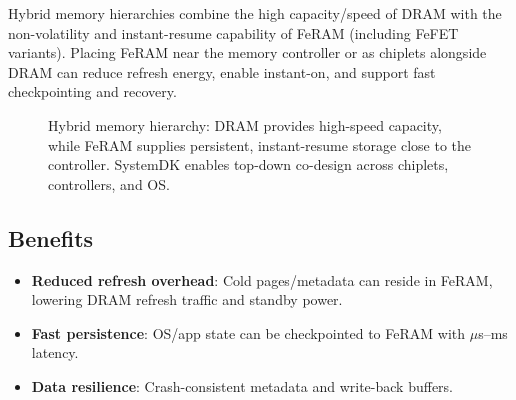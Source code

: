 
Hybrid memory hierarchies combine the high capacity/speed of DRAM with the
non-volatility and instant-resume capability of FeRAM (including FeFET variants).
Placing FeRAM near the memory controller or as chiplets alongside DRAM can
reduce refresh energy, enable instant-on, and support fast checkpointing and recovery.

\begin{figure}[!t]
  \centering
  \caption{Hybrid memory hierarchy: DRAM provides high-speed capacity, while FeRAM
  supplies persistent, instant-resume storage close to the controller. SystemDK enables
  top-down co-design across chiplets, controllers, and OS.}
  \label{fig:hybrid_hierarchy}
\end{figure}

\subsection*{Benefits}
\begin{itemize}
  \item \textbf{Reduced refresh overhead}: Cold pages/metadata can reside in FeRAM, lowering DRAM refresh traffic and standby power.
  \item \textbf{Fast persistence}: OS/app state can be checkpointed to FeRAM with $\mu$s–ms latency.
  \item \textbf{Data resilience}: Crash-consistent metadata and write-back buffers.
\end{itemize}

